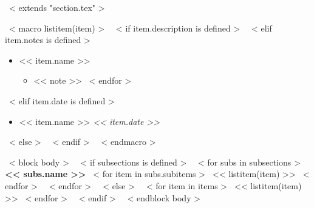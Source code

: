 ~< extends "section.tex" >~

~< macro listitem(item) >~
  ~< if item.description is defined >~
  ~< elif item.notes is defined >~
    \begin{itemize}
      \item{<< item.name >>}
      \begin{itemize}
      ~< for note in item.notes >~
        \item{<< note >>}
      ~< endfor >~
      \end{itemize}
    \end{itemize}
  ~< elif item.date is defined >~
    \begin{samepage}
      \vspace{-0.5em}
      \begin{itemize}
        \setlength{\parskip}{0pt} 
        \setlength{\itemsep}{0pt plus 1pt}
        \item{ << item.name >> \hfill{ \emph{ << item.date >> }}}
      \end{itemize}
      \vspace{-1.25em}
    \end{samepage}
  ~< else >~
  ~< endif >~
~< endmacro >~

~< block body >~
  ~< if subsections is defined >~
    ~< for subs in subsections >~
      \textbf{<< subs.name >>}
        \vspace{0.25em}
        ~< for item in subs.subitems >~
          << listitem(item) >>
        ~< endfor >~
        \vspace{1em}
    ~< endfor >~
  ~< else >~
    ~< for item in items >~
      << listitem(item) >>
    ~< endfor >~
  ~< endif >~
~< endblock body >~
